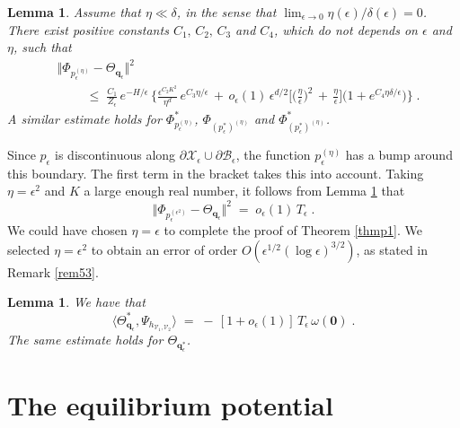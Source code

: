\documentclass[reqno]{amsart}
\newtheorem{lemma}[theorem]{Lemma}
\newcounter{as}[section]
\newcommand{\mc}[1]{{\mathcal #1}}
\newcommand{\bs}[1]{{\boldsymbol #1}}
\newcommand{\<}{\langle}
\renewcommand{\>}{\rangle}
\begin{document}
\begin{lemma}
\label{tp1}
Assume that $\eta\ll \delta$, in the sense that $\lim_{\epsilon \to 0}
\eta(\epsilon)/\delta(\epsilon) =0$.  There exist positive constants
$C_{1},\,C_{2},\,C_{3}$ and $C_{4}$, which do not depends on
$\epsilon$ and $\eta$, such that
\begin{align*}
& \big\Vert \Phi_{p_{\epsilon}^{(\eta)}} -
\Theta_{\bs{q}_{\epsilon}}\big\Vert ^{2} \\
&\qquad \;\le\; \frac {C_{1} }{Z_{\epsilon}}\, e^{- H/\epsilon}\,
\Big\{ \frac{\epsilon^{C_{2}K^{2}}}{\eta^{d}}\,
e^{C_{3} \eta/ \epsilon} \,+\, o_{\epsilon}(1)\,
\epsilon^{d/2} \Big[ \Big(\frac{\eta}{\epsilon}\Big)^{2}
\,+\, \frac{\eta}{\epsilon} \Big]
\Big(1+e^{C_{4}\eta\delta/\epsilon}\Big)\Big\}\;.
\end{align*}
A similar estimate holds for $\Phi_{p_{\epsilon}^{(\eta)}}^{*}$,
$\Phi_{(p_{\epsilon}^{*})^{(\eta)}}$ and
$\Phi_{(p_{\epsilon}^{*})^{(\eta)}}^{*}$.
\end{lemma}

Since $p_{\epsilon}$ is discontinuous along
$\partial\mc{X}_{\epsilon}\cup\partial\mc{B}_{\epsilon}$, the function
$p_{\epsilon}^{(\eta)}$ has a bump around this boundary.  The first
term in the bracket takes this into account. Taking $\eta=\epsilon^2$
and $K$ a large enough real number, it follows from Lemma \ref{tp1}
that
\begin{equation}
\label{se01}
\big\Vert  \Phi_{p_{\epsilon}^{(\epsilon^2)}} -
\Theta_{\bs{q}_{\epsilon}}\big\Vert^{2}
\;=\;o_{\epsilon}(1)\,T_{\epsilon}\;.
\end{equation}
We could have chosen $\eta=\epsilon$ to complete the proof of
  Theorem \ref{thmp1}. We selected $\eta=\epsilon^2$ to obtain
  an error of order $O(\epsilon^{1/2}(\log \epsilon)^{3/2})$, as
  stated in Remark \ref{rem53}.

\begin{lemma}
\label{tp2}
We have that
\begin{equation}
\label{se02}
\big\langle \Theta_{\bs{q}_{\epsilon}}^{*},
\Psi_{h_{\mc{V}_{1},\mc{V}_{2}}} \big\rangle
\;=\;-\, [1+o_{\epsilon}(1)] \, T_{\epsilon}\,
\omega(\bs{0})\;.
\end{equation}
The same estimate holds for $\Theta_{\bs{q}_{\epsilon}^{*}}$.
\end{lemma}

\section{The equilibrium potential}
\label{sec5}
\end{document}
